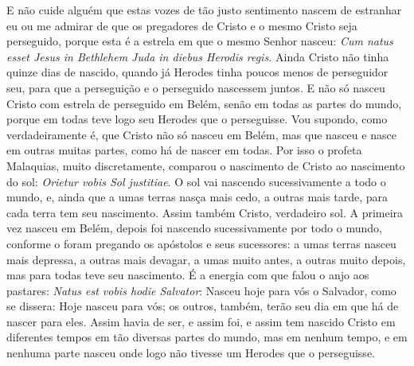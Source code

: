 E não cuide alguém que estas vozes de tão justo sentimento nascem de
estranhar eu ou me admirar de que os pregadores de Cristo e o mesmo
Cristo seja perseguido, porque esta é a estrela em que o mesmo Senhor
nasceu: \emph{Cum natus esset Jesus in Bethlehem Juda in diebus Herodis
regis.} Ainda Cristo não tinha quinze dias de nascido, quando já Herodes
tinha poucos menos de perseguidor seu, para que a perseguição e o
perseguido nascessem juntos. E não só nasceu Cristo com estrela de
perseguido em Belém, senão em todas as partes do mundo, porque em todas
teve logo seu Herodes que o perseguisse. Vou supondo, como
verdadeiramente é, que Cristo não só nasceu em Belém, mas que nasceu e
nasce em outras muitas partes, como há de nascer em todas. Por isso o
profeta Malaquias, muito discretamente, comparou o nascimento de Cristo
ao nascimento do sol: \emph{Orietur vobis Sol justitiae}. O
sol vai nascendo sucessivamente a todo o mundo, e, ainda que a umas
terras nasça mais cedo, a outras mais tarde, para cada terra tem seu
nascimento. Assim também Cristo, verdadeiro sol. A primeira vez nasceu
em Belém, depois foi nascendo sucessivamente por todo o mundo, conforme
o foram pregando os apóstolos e seus sucessores: a umas terras nasceu
mais depressa, a outras mais devagar, a umas muito antes, a outras muito
depois, mas para todas teve seu nascimento. É a energia com que falou o
anjo aos pastares: \emph{Natus est vobis hodie Salvator}: %
Nasceu hoje para vós o Salvador, como se dissera: Hoje nasceu
para vós; os outros, também, terão seu dia em que há de nascer para
eles. Assim havia de ser, e assim foi, e assim tem nascido Cristo em
diferentes tempos em tão diversas partes do mundo, mas em nenhum tempo,
e em nenhuma parte nasceu onde logo não tivesse um Herodes que o
perseguisse.

